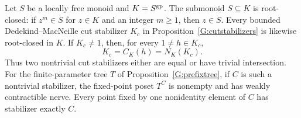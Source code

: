 \begin{proposition}
\label{G:cutroots}
Let $S$ be a locally free monoid and $K=S^{\mathrm{gp}}$.
The submonoid $S\subseteq K$ is root-closed: if $z^m\in S$
for $z\in K$ and an integer $m\ge1$, then $z\in S$.
Every bounded Dedekind--MacNeille cut stabilizer $K_c$ in
Proposition~\ref{G:cutstabilizers} is likewise root-closed in $K$.
If $K_c\ne1$, then, for every $1\ne h\in K_c$,
\[
 K_c=C_K(h)=N_K(K_c).
\]
Thus two nontrivial cut stabilizers either are equal or have
trivial intersection. For the finite-parameter tree $T$ of
Proposition~\ref{G:prefixtree}, if $C$ is such a nontrivial
stabilizer, the fixed-point poset $T^C$ is nonempty and has
weakly contractible nerve. Every point fixed by one nonidentity
element of $C$ has stabilizer exactly $C$.
\end{proposition}
